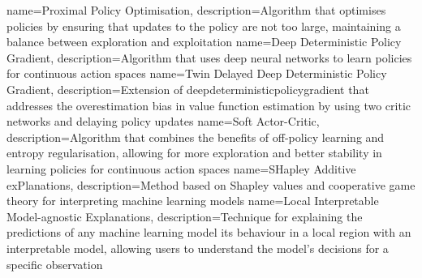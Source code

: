 {
    name=Proximal Policy Optimisation,
    description={Algorithm that optimises policies by ensuring that updates to the policy are not too large, maintaining a balance between exploration and exploitation}
}
{
    name=Deep Deterministic Policy Gradient,
    description={Algorithm that uses deep neural networks to learn policies for continuous action spaces}
}
{
    name=Twin Delayed Deep Deterministic Policy Gradient,
    description={Extension of \Gls{deepdeterministicpolicygradient} that addresses the overestimation bias in value function estimation by using two critic networks and delaying policy updates}
}
{
    name=Soft Actor-Critic,
    description={Algorithm that combines the benefits of off-policy learning and entropy regularisation, allowing for more exploration and better stability in learning policies for continuous action spaces}
}
{
    name=SHapley Additive exPlanations,
    description={Method based on Shapley values and cooperative game theory for interpreting machine learning models}
}
{
    name=Local Interpretable Model-agnostic Explanations,
    description={Technique for explaining the predictions of any machine learning model its behaviour in a local region with an interpretable model, allowing users to understand the model's decisions for a specific observation}
}
